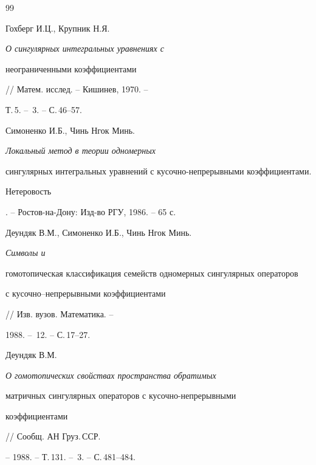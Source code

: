 \begin{thebibliography}{99}


Гохберг И.Ц., Крупник Н.Я. {\em О сингулярных интегральных уравнениях с


неограниченными коэффициентами} // Матем. исслед. -- Кишинев, 1970. --


Т.\,5. -- \No\,3. -- С.\,46--57.




Симоненко И.Б., Чинь Нгок Минь. {\em Локальный метод в теории одномерных


сингулярных интегральных уравнений с кусочно-непрерывными коэффициентами.


Нетеровость}. -- Ростов-на-Дону: Изд-во РГУ, 1986. -- 65 с.




Деундяк В.М., Симоненко И.Б., Чинь Нгок Минь. {\em Символы и


гомотопическая классификация семейств одномерных сингулярных операторов


с кусочно--непрерывными	коэффициентами} // Изв. вузов. Математика. --


1988. -- \No\,12. -- С.\,17--27.




Деундяк В.М. {\em О гомотопических свойствах пространства обратимых


матричных сингулярных операторов с кусочно-непрерывными


коэффициентами} // Сообщ. АН Груз.\,ССР.


-- 1988. -- Т.\,131. -- \No\,3. -- С.\,481--484.





\end{thebibliography}





\vskip 2cm












\label{end}





